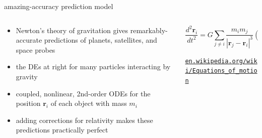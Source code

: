 \documentclass{beamer}
\begin{document}
\begin{frame}{amazing-accuracy prediction model}

\begin{columns}
\begin{column}{0.55\textwidth}
\begin{itemize}
\item Newton's theory of gravitation gives remarkably-accurate predictions of planets, satellites, and space probes
\item the DEs at right for many particles interacting by gravity
\item coupled, nonlinear, 2nd-order ODEs for the position $\mathbf{r}_i$ of each object with mass $m_i$
\item adding corrections for relativity makes these predictions practically perfect
\end{itemize}
\end{column}
\begin{column}{0.45\textwidth}
$$\frac{d^2 \mathbf{r}_i}{dt^2} = G \sum_{j\ne i} \frac{m_i m_j}{|\mathbf{r}_j - \mathbf{r}_i|^3} (\mathbf{r}_j - \mathbf{r}_i)$$

\medskip

\quad \tiny \href{https://en.wikipedia.org/wiki/Equations_of_motion}{\texttt{en.wikipedia.org/wiki/Equations\_of\_motion}}
\end{column}
\end{columns}
\end{frame}
\end{document}
